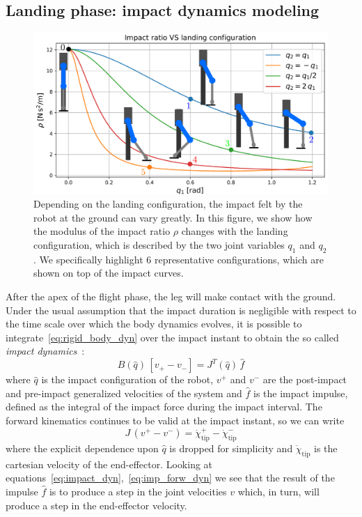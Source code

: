 \subsection{Landing phase: impact dynamics modeling}\label{subsec:impact_min}
\begin{figure}[t]
    \centering
    \includegraphics[width=1\columnwidth]{images/impact_ratio.pdf}
    \caption{Depending on the landing configuration, the impact felt by the robot at the ground can vary greatly. In this figure, we show how the modulus of the impact ratio $\rho$ changes with the landing configuration, which is described by the two joint variables $q_1$ and $q_2$. We specifically highlight 6 representative configurations, which are shown on top of the impact curves.}
    \label{fig:impact_ratio}
\end{figure}
After the apex of the flight phase, the leg will make contact with the ground. Under the usual assumption that the impact duration is negligible with respect to the time scale over which the body dynamics evolves, it is possible to integrate~\eqref{eq:rigid_body_dyn} over the impact instant to obtain the so called \textit{impact dynamics}~\cite{impact_dyn::walker1990use}:
\begin{equation}
    \label{eq:impact_dyn}
B(\hat{q})\,\left[v_{+} - v_{-}\right] = J^{T}(\hat{q})\,\hat{f}
\end{equation}
where $\hat{q}$ is the impact configuration of the robot, $v^{+}$ and $v^{-}$ are the post-impact and pre-impact generalized velocities of the system and $\hat{f}$ is the impact impulse, defined as the integral of the impact force during the impact interval.
The forward kinematics continues to be valid at the impact instant, so we can write
\begin{equation}\label{eq:imp_forw_dyn}
    J\,\left( v^{+} - v^{-} \right) = \dot{\chi}_{\mathrm{tip}}^{+} - \dot{\chi}_{\mathrm{tip}}^{-}
\end{equation}
where the explicit dependence upon $\hat{q}$ is dropped for simplicity and $\dot{\chi}_{\mathrm{tip}}$ is the cartesian velocity of the end-effector. 
Looking at equations~\eqref{eq:impact_dyn},~\eqref{eq:imp_forw_dyn} we see that the result of the impulse $\hat{f}$ is to produce a step in the joint velocities $v$ which, in turn, will produce a step in the end-effector velocity. 

